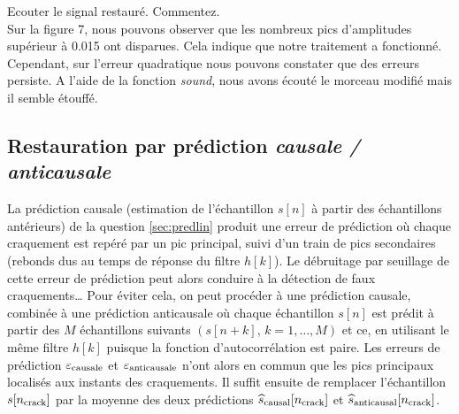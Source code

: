 \documentclass{article}
\begin{document}
Ecouter le signal restauré. Commentez.\\
\newline
Sur la figure 7, nous pouvons observer que les nombreux pics d'amplitudes supérieur à 0.015 ont disparues. Cela indique que notre traitement a fonctionné. Cependant, sur l'erreur quadratique nous pouvons constater que des erreurs persiste. A l'aide de la fonction \textit{sound}, nous avons écouté le morceau modifié mais il semble étouffé. 
\clearpage

\subsection{Restauration par prédiction {\em causale / anticausale}}

La prédiction causale (estimation de l'échantillon $s[n]$ à partir des échantillons antérieurs) de la question \ref{sec:predlin} produit une erreur de prédiction où chaque craquement est repéré par un pic principal, suivi d'un train de pics secondaires (rebonds dus au temps de réponse du filtre $h[k]$). Le débruitage par seuillage de cette erreur de prédiction peut alors conduire à la détection de faux craquements\ldots
Pour éviter cela, on peut procéder à une prédiction causale, combinée à une prédiction anticausale où chaque échantillon 
$s[n]$ est prédit à partir des $M$ échantillons suivants $(s[n+k],\,k=1,\ldots,M)$ et ce, en utilisant le même filtre $h[k]$ puisque la fonction d'autocorrélation est paire. Les erreurs de prédiction $\varepsilon_{\rm causale}$ et $\varepsilon_{\rm anticausale}$ n'ont alors en commun que les pics principaux localisés aux instants des craquements. Il suffit ensuite de remplacer l'échantillon $s[n_{\rm crack}]$ par la moyenne des deux prédictions $\widehat{s}_{\rm causal}[n_{\rm crack}]$ et $\widehat{s}_{\rm anticausal}[n_{\rm crack}]$. \\
\end{document}
